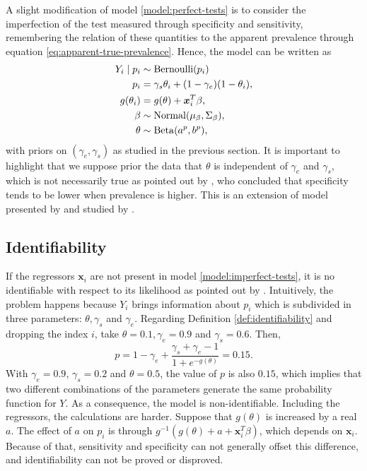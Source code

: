 A slight modification of model \eqref{model:perfect-tests} is to consider
the imperfection of the test measured through specificity and sensitivity,
remembering the relation of these quantities to the apparent prevalence
through equation \eqref{eq:apparent-true-prevalence}. Hence, the model can be
written as
\begin{equation}
  \label{model:imperfect-tests}
  \begin{aligned}
    Y_i \mid p_i & \sim \operatorname{Bernoulli}(p_i)                                  \\
    p_i          & = \gamma_s\theta_i + (1-\gamma_e)(1 - \theta_i), \\
    g(\theta_i)  & = g(\theta) + \boldsymbol{x}_i^T\beta,                       \\
    \beta        & \sim \operatorname{Normal}(\mu_{\beta}, \Sigma_{\beta}),            \\
    \theta       & \sim \operatorname{Beta}(a^p, b^p),
  \end{aligned}
\end{equation}
with priors on $(\gamma_e, \gamma_s)$ as studied in the previous section. It is
important to highlight that we suppose prior the data that $\theta$ is
independent of $\gamma_e$ and $\gamma_s$, which is not necessarily true as
pointed out by \textcite{leeflang2013variation}, who concluded that
specificity tends to be lower when prevalence is higher. This
is an extension of model presented by \textcite{gelman2020bayesian} and
studied by \textcite{mcinturff2004modelling}.

\subsection{Identifiability}

If the regressors $\boldsymbol{x}_i$ are not present in model
\eqref{model:imperfect-tests}, it is no identifiable with respect to its
likelihood as pointed out by \textcite[p. 1271]{gelman2020bayesian}.
Intuitively, the problem happens because $Y_i$ brings information about
$p_i$ which is subdivided in three parameters: $\theta, \gamma_s$ and
$\gamma_e$. Regarding Definition \ref{def:identifiability} and dropping the
index $i$, take $\theta = 0.1, \gamma_e = 0.9$ and $\gamma_s = 0.6$. Then,
\begin{equation*}
  p = 1 - \gamma_e + \frac{\gamma_s + \gamma_e - 1}{1 + e^{-g(\theta)}} = 0.15.
\end{equation*}
With $\gamma_e = 0.9$, $\gamma_s = 0.2$ and $\theta = 0.5$, the value of $p$
is also $0.15$, which implies that two
different combinations of the parameters generate the same probability
function for $Y$. As a consequence, the model is non-identifiable. Including the
regressors, the calculations are harder. Suppose that $g(\theta)$
is increased by a real $a$. The effect of $a$ on $p_i$ is through
$g^{-1}(g(\theta) + a + \boldsymbol{x}_i^T\beta)$, which depends on
$\boldsymbol{x}_i$. Because of that, sensitivity and specificity can not generally
offset this difference, and identifiability can not be proved or disproved.

